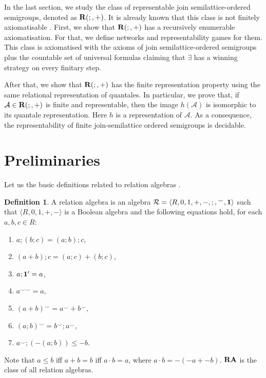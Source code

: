 \documentclass[a4paper]{article}
\theoremstyle{definition}
\newtheorem{definition}{Definition}
\theoremstyle{theorem}
\theoremstyle{proposition}
\theoremstyle{lemma}
\theoremstyle{ex}
\theoremstyle{corollary}
\theoremstyle{claim}
\begin{document}
In the last section, we study the class of representable join semilattice-ordered semigroups, denoted as ${\bf R}(;,+)$. It is
already known that this class is not finitely axiomatisable \cite{andreka2011axiomatizability}.
First, we show that ${\bf R}(;,+)$ has a recursively enumerable axiomatisation. For that,
we define networks and representability games for them. This class is axiomatised with the axioms of join semilattice-ordered semigroups plus the countable set of universal formulas claiming that
$\exists$ has a winning strategy on every finitary step.

After that, we show that ${\bf R}(;,+)$ has the finite representation property using the same relational representation of quantales. In particular, we prove that, if $\mathcal{A} \in {\bf R}(;,+)$ is finite and representable, then the image $h(\mathcal{A})$ is isomorphic to its quantale representation. Here $h$ is a representation of $\mathcal{A}$. As a consequence, the representability of finite join-semilattice ordered semigroups is decidable.

\section{Preliminaries}

Let us the basic definitions related to relation algebras \cite{hirsch2002relation}.
\begin{definition} A relation algebra is an algebra $\mathcal{R} = \langle R, 0, 1, +, -, ;, {}^{\smile}, {\bf 1 }\rangle$ such that $\langle R, 0, 1, +, - \rangle$ is a Boolean algebra and the following equations hold, for each $a, b, c \in R$:
    \begin{enumerate}
      \item $a ; (b ; c) = (a ; b) ; c$,
      \item $(a + b) ; c = (a ; c) + (b ; c)$,
      \item $a ; {\bf 1}' = a$,
      \item $a^{\smile \smile} = a$,
      \item $(a + b)^{\smile} = a^{\smile} + b^{\smile}$,
      \item $(a ; b)^{\smile} = b^{\smile} ; a^{\smile}$,
      \item $a^{\smile} ; (- (a ; b)) \leq - b$.
    \end{enumerate}
    Note that $a \leq b$ iff $a + b = b$ iff $a \cdot b = a$, where $a \cdot b = - (- a + - b)$. ${\bf RA}$ is the class of all relation algebras.
\end{definition}
\end{document}
